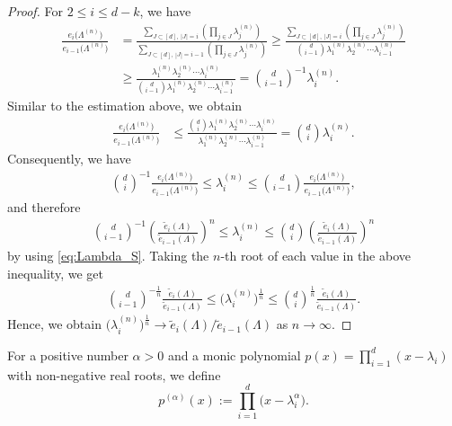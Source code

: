 \documentclass[pdftex]{sigma}
\numberwithin{equation}{section}
\begin{document}
\begin{proof}
For {$2\le i \le d-k$}, we have
\begin{align*}
\frac{e_{i}\big(\Lambda^{(n)}\big)}{e_{i-1}\big(\Lambda^{(n)}\big)} &= \frac{\sum_{J \subset [d],\ |J|=i} \left( \prod_{j \in J} \lambda_{j}^{(n)} \right)}{ \sum_{J \subset [d],\ |J|=i-1} \left( \prod_{j \in J} \lambda_{j}^{(n)} \right)}\ge \frac{\sum_{J \subset [d],\ |J|=i} \left( \prod_{j \in J} \lambda_{j}^{(n)} \right)}{\binom{d}{i-1} \lambda_{1}^{(n)}\lambda_{2}^{(n)}\cdots \lambda_{i-1}^{(n)}}\\
&\ge \frac{\lambda_{1}^{(n)}\lambda_{2}^{(n)}\cdots \lambda_{i}^{(n)}}{\binom{d}{i-1} \lambda_{1}^{(n)}\lambda_{2}^{(n)}\cdots \lambda_{i-1}^{(n)}}=\binom{d}{i-1}^{-1} \lambda_{i}^{(n)}.
\end{align*}
Similar to the estimation above, we obtain
\begin{align*}
\frac{e_{i}\big(\Lambda^{(n)}\big)}{e_{i-1}\big(\Lambda^{(n)}\big)}  &\le \frac{\binom{d}{i}\lambda_{1}^{(n)}\lambda_{2}^{(n)}\cdots \lambda_{i}^{(n)} }{\lambda_{1}^{(n)}\lambda_{2}^{(n)}\cdots \lambda_{i-1}^{(n)}} = \binom{d}{i} \lambda_{i}^{(n)}.
\end{align*}
Consequently, we have
\begin{align*}
\binom{d}{i}^{-1} \frac{e_i\big(\Lambda^{(n)}\big)}{e_{i-1}\big(\Lambda^{(n)}\big)} \le \lambda_{i}^{(n)} \le \binom{d}{i-1} \frac{e_i\big(\Lambda^{(n)}\big)}{e_{i-1}\big(\Lambda^{(n)}\big)},
\end{align*}
and therefore
\begin{align*}
\binom{d}{{i-1}}^{-1} \left(\frac{\widetilde{e}_i(\Lambda)}{\widetilde{e}_{i-1}(\Lambda)} \right)^n \le \lambda_{i}^{(n)} \le \binom{d}{{i}} \left(\frac{\widetilde{e}_i(\Lambda)}{\widetilde{e}_{i-1}(\Lambda)} \right)^n
\end{align*}
by using \eqref{eq:Lambda_S}.
Taking the $n$-th root of each value in the above inequality, we get
\begin{align*}
\binom{d}{{i-1}}^{-\frac{1}{n}} \frac{\widetilde{e}_i(\Lambda)}{\widetilde{e}_{i-1}(\Lambda)} \le \big(\lambda_{i}^{(n)}\big)^{\frac{1}{n}} \le \binom{d}{{i}}^{\frac{1}{n}} \frac{\widetilde{e}_i(\Lambda)}{\widetilde{e}_{i-1}(\Lambda)}.
\end{align*}
Hence, we obtain $\big(\lambda_{i}^{(n)}\big)^{\frac{1}{n}} \rightarrow   {\widetilde{e}_i(\Lambda)}/{\widetilde{e}_{i-1}(\Lambda)}$ as $n\rightarrow\infty$.
\end{proof}

For a positive number $\alpha > 0$ and a monic polynomial $p(x)=\prod_{i=1}^d (x-\lambda_{i})$ with non-negative real roots, we define
\[
p^{(\alpha)}(x):=\prod_{i=1}^d \big(x-\lambda_{i}^\alpha\big).
\]
\end{document}
